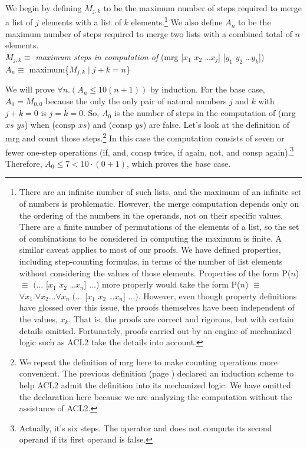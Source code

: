 We begin by defining $M_{j,k}$ to be the maximum number of steps required to merge a list
of $j$ elements with a list of $k$ elements.\footnote{There are an infinite number
of such lists, and the maximum of an infinite set of numbers is problematic.
However, the merge computation depends only
on the ordering of the numbers in the operands,
not on their specific values.
There are a finite number of permutations of the elements of a list,
so the set of combinations to be considered in computing the maximum is finite.
A similar caveat applies to most of our proofs.
We have defined properties, including step-counting formulas,
in terms of the number of list elements
without considering the values of those elements.
Properties of the form P($n$) $\equiv$ $(\dots$ [$x_1$ $x_2$ \dots $x_n$] $\dots)$
more properly would take the form
P($n$) $\equiv$ $\forall x_1.\forall x_2\dots\forall x_n.(\dots$ [$x_1$ $x_2$ \dots $x_n$] $\dots)$.
However, even though property definitions have glossed over this issue,
the proofs themselves have been independent of the values, $x_k$.
That is, the proofs are correct and rigorous, but with certain details omitted.
Fortunately, proofs carried out by an engine of
mechanized logic such as ACL2 take the details into account.}
We also define $A_n$ to be the maximum number of steps required to merge two lists
with a combined total of $n$ elements.\\
\hspace*{1cm}$M_{j,k} \equiv$ \emph{maximum steps in computation of} \textsf{(mrg [$x_1$ $x_2$ \dots $x_j$] [$y_1$ $y_2$ \dots $y_k$])} \\
\hspace*{1cm}$A_n \equiv$ maximum\{$M_{j,k} \mid j + k = n$\}

We will
prove $\forall n.(A_n \leq 10(n+1))$ by induction.
For the base case, $A_0 = M_{0,0}$ because the only the only pair of natural
numbers $j$ and $k$ with $j + k = 0$ is $j = k = 0$.
So, $A_0$ is the number of steps in the computation of \textsf{(mrg $xs$ $ys$)}
when \textsf{(consp $xs$)} and \textsf{(consp $ys$)} are false.
Let's look at the definition of \textsf{mrg} and count those steps.\footnote{We
repeat the definition of \textsf{mrg} here to make counting operations more convenient.
The previous definition (page \pageref{defun:mrg})
declared an induction scheme to help ACL2
admit the definition into its mechanized logic.
We have omitted the declaration here because we are analyzing
the computation without the assistance of ACL2.}
In this case the computation consists of seven or fewer one-step operations
(\textsf{if}, \textsf{and}, \textsf{consp} twice,
\textsf{if} again, \textsf{not}, and \textsf{consp} again).\footnote{Actually,
it's six steps. The operator \textsf{and} does not compute its second operand
if its first operand is false.}
Therefore, $A_0 \leq 7 < 10\cdot(0 + 1)$, which proves the base case.

